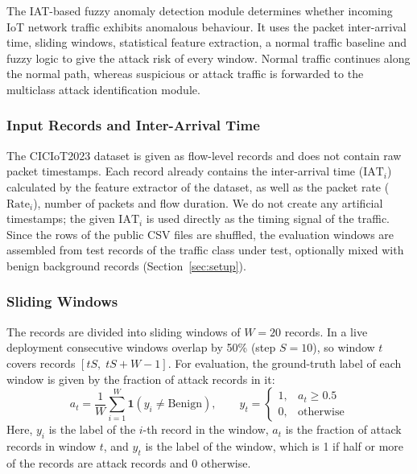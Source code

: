 \documentclass[]{interact}
\theoremstyle{plain}%
\theoremstyle{definition}
\theoremstyle{remark}
\begin{document}
The IAT-based fuzzy anomaly detection module determines whether incoming IoT network traffic exhibits anomalous behaviour. It uses the packet inter-arrival time, sliding windows, statistical feature extraction, a normal traffic baseline and fuzzy logic to give the attack risk of every window. Normal traffic continues along the normal path, whereas suspicious or attack traffic is forwarded to the multiclass attack identification module.

\subsubsection{Input Records and Inter-Arrival Time}
The CICIoT2023 dataset is given as flow-level records and does not contain raw packet timestamps. Each record already contains the inter-arrival time ($\mathrm{IAT}_i$) calculated by the feature extractor of the dataset, as well as the packet rate ($\mathrm{Rate}_i$), number of packets and flow duration. We do not create any artificial timestamps; the given $\mathrm{IAT}_i$ is used directly as the timing signal of the traffic. Since the rows of the public CSV files are shuffled, the evaluation windows are assembled from test records of the traffic class under test, optionally mixed with benign background records (Section~\ref{sec:setup}).

\subsubsection{Sliding Windows}
The records are divided into sliding windows of $W = 20$ records. In a live deployment consecutive windows overlap by 50\% (step $S = 10$), so window $t$ covers records $[tS,\; tS + W - 1]$. For evaluation, the ground-truth label of each window is given by the fraction of attack records in it:
\begin{equation}
  a_t = \frac{1}{W}\sum_{i=1}^{W} \mathbf{1}\!\left(y_i \neq \text{Benign}\right),
  \qquad
  y_t =
  \begin{cases}
    1, & a_t \ge 0.5\\
    0, & \text{otherwise}
  \end{cases}
\end{equation}
Here, $y_i$ is the label of the $i$-th record in the window, $a_t$ is the fraction of attack records in window $t$, and $y_t$ is the label of the window, which is 1 if half or more of the records are attack records and 0 otherwise.
\end{document}

